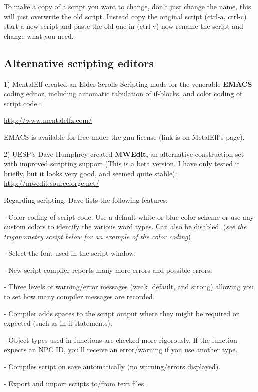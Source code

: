 \documentclass[
]{article}
\begin{document}
To make a copy of a script you want to change, don't just change the
name, this will just overwrite the old script. Instead copy the original
script (ctrl-a, ctrl-c) start a new script and paste the old one in
(ctrl-v) now rename the script and change what you need.

\hypertarget{alternative-scripting-editors}{%
\subsection{Alternative scripting
editors}\label{alternative-scripting-editors}}

1) MentalElf created an Elder Scrolls Scripting mode for the venerable
\textbf{EMACS} coding editor, including automatic tabulation of
if-blocks, and color coding of script code.:

\url{http://www.mentalelfz.com/}

EMACS is available for free under the gnu license (link is on MetalElf's
page).

2) UESP's Dave Humphrey created \textbf{MWEdit,} an alternative
construction set with improved scripting support (This is a beta
version. I have only tested it briefly, but it looks very good, and
seemed quite stable): \url{http://mwedit.sourceforge.net/}

Regarding scripting, Dave lists the following features:

- Color coding of script code. Use a default white or blue color scheme
or use any custom colors to identify the various word types. Can also be
disabled. (\emph{see the trigonometry script below for an example of the
color coding})

- Select the font used in the script window.

- New script compiler reports many more errors and possible errors.

- Three levels of warning/error messages (weak, default, and strong)
allowing you to set how many compiler messages are recorded.

- Compiler adds spaces to the script output where they might be required
or expected (such as in if statements).

- Object types used in functions are checked more rigorously. If the
function expects an NPC ID, you'll receive an error/warning if you use
another type.

- Compiles script on save automatically (no warning/errors displayed).

- Export and import scripts to/from text files.
\end{document}
